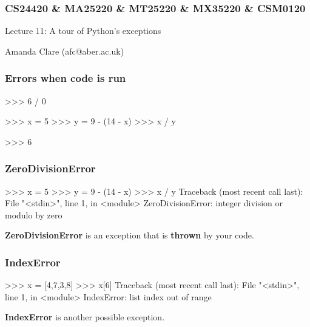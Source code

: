 \documentclass{beamer}
\begin{document}

\begin{frame}
\frametitle{CS24420 \& MA25220 \& MT25220 \& MX35220 \& CSM0120}

\begin{center}
\begin{huge}
Lecture 11: A tour of Python's exceptions
\end{huge}
\bigskip

Amanda Clare (afc@aber.ac.uk)

\end{center}
\end{frame}


\begin{frame}[fragile]
\frametitle{Errors when code is run}
\begin{code}
>>> 6 / 0

>>> x = 5
>>> y = 9 - (14 - x)
>>> x / y

>>> 6 %
\end{code}
\end{frame}

\begin{frame}[fragile]
\frametitle{ZeroDivisionError}
\begin{code}
>>> x = 5
>>> y = 9 - (14 - x)
>>> x / y
Traceback (most recent call last):
File "<stdin>", line 1, in <module>
ZeroDivisionError: integer division or modulo by zero
\end{code}

\bigskip

\textbf{ZeroDivisionError} is an exception that is \textbf{thrown} by your
code.
\end{frame}

\begin{frame}[fragile]
\frametitle{IndexError}
\begin{code}
>>> x = [4,7,3,8]
>>> x[6]
Traceback (most recent call last):
File "<stdin>", line 1, in <module>
IndexError: list index out of range
\end{code}
\textbf{IndexError} is another possible exception.
\end{frame}
\end{document}
